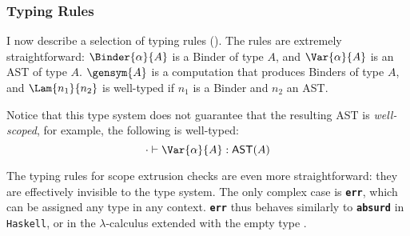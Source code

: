 


\subsubsection{Typing Rules}
I now describe a selection of \coreLang{} typing rules (). The rules are extremely straightforward: $\Binder{\alpha}{A}$ is a \textsf{Binder} of type $A$, and $\Var{\alpha}{A}$ is an \textsf{AST} of type $A$. $\gensym{A}$ is a computation that produces \textsf{Binder}s of type $A$, and $\Lam{n_1}{n_2}$ is well-typed if $n_1$ is a \textsf{Binder} and $n_2$ an AST. 

Notice that this type system does not guarantee that the resulting AST is \textit{well-scoped}, for example, the following is well-typed:
\[\cdot \vdash {\Var{\alpha}{A}}: {\textsf{AST}(A)}\]

The typing rules for scope extrusion checks are even more straightforward: they are effectively invisible to the type system. The only complex case is \textbf{\texttt{err}}, which can be assigned any type in any context. \textbf{\texttt{err}} thus behaves similarly to \textbf{\texttt{absurd}} in \texttt{Haskell}, or in the $\lambda$-calculus extended with the empty type \citep{scherer-2017}.

